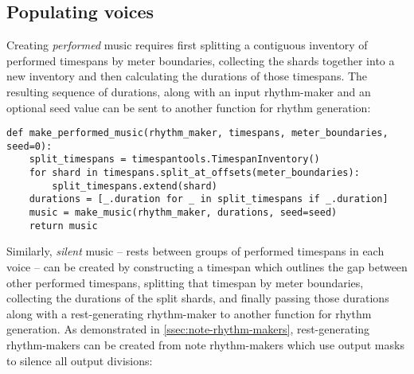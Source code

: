 \subsection{Populating voices}
\label{ssec:populating-voices}

Creating \emph{performed} music requires first splitting a contiguous inventory
of performed timespans by meter boundaries, collecting the shards together into
a new inventory and then calculating the durations of those timespans. The
resulting sequence of durations, along with an input rhythm-maker and an
optional seed value can be sent to another function for rhythm generation:

\begin{comment}
<abjadextract dissertation.py.time_tools:make_performed_music />[strip_prompt]
\end{comment}

\begin{abjadbookoutput}
\begin{singlespacing}
\vspace{-0.5\baselineskip}
\begin{verbatim}
def make_performed_music(rhythm_maker, timespans, meter_boundaries, seed=0):
    split_timespans = timespantools.TimespanInventory()
    for shard in timespans.split_at_offsets(meter_boundaries):
        split_timespans.extend(shard)
    durations = [_.duration for _ in split_timespans if _.duration]
    music = make_music(rhythm_maker, durations, seed=seed)
    return music
\end{verbatim}
\end{singlespacing}
\end{abjadbookoutput}

\noindent Similarly, \emph{silent} music -- rests between groups of performed
timespans in each voice -- can be created by constructing a timespan which
outlines the gap between other performed timespans, splitting that timespan by
meter boundaries, collecting the durations of the split shards, and finally
passing those durations along with a rest-generating rhythm-maker to another
function for rhythm generation. As demonstrated in
\autoref{ssec:note-rhythm-makers}, rest-generating rhythm-makers can be created
from note rhythm-makers which use output masks to silence all output divisions:

\begin{comment}
<abjadextract dissertation.py.time_tools:make_silent_music />[strip_prompt]
\end{comment}


